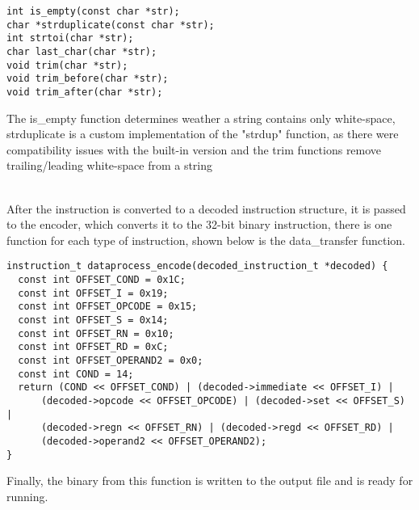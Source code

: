\begin{verbatim}
int is_empty(const char *str);
char *strduplicate(const char *str);
int strtoi(char *str);
char last_char(char *str);
void trim(char *str);
void trim_before(char *str);
void trim_after(char *str);
\end{verbatim} 

The is_empty function determines weather a string contains only white-space, strduplicate is a custom implementation of the "strdup" function, as there were compatibility issues with the built-in version and the trim functions remove trailing/leading white-space from a string

~\\

After the instruction is converted to a decoded instruction structure, it is passed to the encoder, which converts it to the 32-bit binary instruction, there is one function for each type of instruction, shown below is the data_transfer function.

\begin{verbatim}
instruction_t dataprocess_encode(decoded_instruction_t *decoded) {
  const int OFFSET_COND = 0x1C;
  const int OFFSET_I = 0x19;
  const int OFFSET_OPCODE = 0x15;
  const int OFFSET_S = 0x14;
  const int OFFSET_RN = 0x10;
  const int OFFSET_RD = 0xC;
  const int OFFSET_OPERAND2 = 0x0;
  const int COND = 14;
  return (COND << OFFSET_COND) | (decoded->immediate << OFFSET_I) |
      (decoded->opcode << OFFSET_OPCODE) | (decoded->set << OFFSET_S) |
      (decoded->regn << OFFSET_RN) | (decoded->regd << OFFSET_RD) |
      (decoded->operand2 << OFFSET_OPERAND2);
}
\end{verbatim}

Finally, the binary from this function is written to the output file and is ready for running.